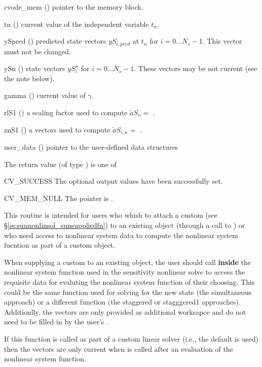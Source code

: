 {
  \begin{args}
  \item[cvode\_mem] () pointer to the {\cvodes} memory block.
  \item[tn] () current value of the independent variable $t_n$.
  \item[ySpred] () predicted state vectors $yS_{i,pred}$ at
    $t_n$ for $i = 0 \dots N_s - 1$.
    This vector must not be changed.
  \item[ySn] () state vectors $yS_i^n$ for
    $i = 0 \dots N_s - 1$. These vectors may be not current (see the note
    below).
  \item[gamma] () current value of $\gamma$.
  \item[rlS1] () a scaling factor used to compute $\tilde{a}S_n = $
    .
  \item[znS1] () a vectors used to compute $\tilde{a}S_{i,n} = $
    .
  \item[user\_data] () pointer to the user-defined data structures
  \end{args}
}
{
  The return value  (of type ) is one of
  \begin{args}
  \item[CV\_SUCCESS]
    The optional output values have been successfully set.
  \item[CV\_MEM\_NULL]
    The  pointer is .
  \end{args}
}
{
  This routine is intended for users who whish to attach a custom
   (see \S\ref{ss:sunnonlinsol_sunsuppliedfn}) to an
  existing  object (through a call to
  ) or who need access to nonlinear system data to
  compute the nonlinear system fucntion as part of a custom
   object.

  When supplying a custom  to an existing
   object, the user should call
   \textbf{inside} the nonlinear system
  function used in the sensitivity nonlinear solve to access the requisite data
  for evaluting the nonlinear system function of their choosing. This could be
  the same function used for solving for the new state (the simultaneous
  approach) or a different function (the staggered or stagggered1 approaches).
  Additionlly, the vectors  are only provided as additional
  worksapce and do not need to be filled in by the user's
  .

  If this function is called as part of a custom linear solver (i.e., the
  default  is used) then the vectors 
  are only current when  is called after an
  evaluation of the nonlinear system function.
}
